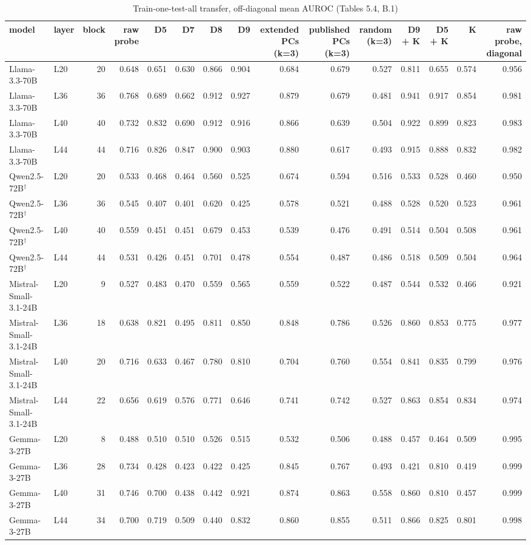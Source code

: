 \begin{table}
\caption{Train-one-test-all transfer, off-diagonal mean AUROC (Tables 5.4, B.1)}
\label{tab:x-transfer}
\begin{tabular}{llrrrrrrrrrrrrr}
\toprule
model & layer & block & raw probe & D5 & D7 & D8 & D9 & extended PCs (k=3) & published PCs (k=3) & random (k=3) & D9 + K & D5 + K & K & raw probe, diagonal \\
\midrule
Llama-3.3-70B & L20 & 20 & 0.648 & 0.651 & 0.630 & 0.866 & 0.904 & 0.684 & 0.679 & 0.527 & 0.811 & 0.655 & 0.574 & 0.956 \\
Llama-3.3-70B & L36 & 36 & 0.768 & 0.689 & 0.662 & 0.912 & 0.927 & 0.879 & 0.679 & 0.481 & 0.941 & 0.917 & 0.854 & 0.981 \\
Llama-3.3-70B & L40 & 40 & 0.732 & 0.832 & 0.690 & 0.912 & 0.916 & 0.866 & 0.639 & 0.504 & 0.922 & 0.899 & 0.823 & 0.983 \\
Llama-3.3-70B & L44 & 44 & 0.716 & 0.826 & 0.847 & 0.900 & 0.903 & 0.880 & 0.617 & 0.493 & 0.915 & 0.888 & 0.832 & 0.982 \\
Qwen2.5-72B$^\dagger$ & L20 & 20 & 0.533 & 0.468 & 0.464 & 0.560 & 0.525 & 0.674 & 0.594 & 0.516 & 0.533 & 0.528 & 0.460 & 0.950 \\
Qwen2.5-72B$^\dagger$ & L36 & 36 & 0.545 & 0.407 & 0.401 & 0.620 & 0.425 & 0.578 & 0.521 & 0.488 & 0.528 & 0.520 & 0.523 & 0.961 \\
Qwen2.5-72B$^\dagger$ & L40 & 40 & 0.559 & 0.451 & 0.451 & 0.679 & 0.453 & 0.539 & 0.476 & 0.491 & 0.514 & 0.504 & 0.508 & 0.961 \\
Qwen2.5-72B$^\dagger$ & L44 & 44 & 0.531 & 0.426 & 0.451 & 0.701 & 0.478 & 0.554 & 0.487 & 0.486 & 0.518 & 0.509 & 0.504 & 0.964 \\
Mistral-Small-3.1-24B & L20 & 9 & 0.527 & 0.483 & 0.470 & 0.559 & 0.565 & 0.559 & 0.522 & 0.487 & 0.544 & 0.532 & 0.466 & 0.921 \\
Mistral-Small-3.1-24B & L36 & 18 & 0.638 & 0.821 & 0.495 & 0.811 & 0.850 & 0.848 & 0.786 & 0.526 & 0.860 & 0.853 & 0.775 & 0.977 \\
Mistral-Small-3.1-24B & L40 & 20 & 0.716 & 0.633 & 0.467 & 0.780 & 0.810 & 0.704 & 0.760 & 0.554 & 0.841 & 0.835 & 0.799 & 0.976 \\
Mistral-Small-3.1-24B & L44 & 22 & 0.656 & 0.619 & 0.576 & 0.771 & 0.646 & 0.741 & 0.742 & 0.527 & 0.863 & 0.854 & 0.834 & 0.974 \\
Gemma-3-27B & L20 & 8 & 0.488 & 0.510 & 0.510 & 0.526 & 0.515 & 0.532 & 0.506 & 0.488 & 0.457 & 0.464 & 0.509 & 0.995 \\
Gemma-3-27B & L36 & 28 & 0.734 & 0.428 & 0.423 & 0.422 & 0.425 & 0.845 & 0.767 & 0.493 & 0.421 & 0.810 & 0.419 & 0.999 \\
Gemma-3-27B & L40 & 31 & 0.746 & 0.700 & 0.438 & 0.442 & 0.921 & 0.874 & 0.863 & 0.558 & 0.860 & 0.810 & 0.457 & 0.999 \\
Gemma-3-27B & L44 & 34 & 0.700 & 0.719 & 0.509 & 0.440 & 0.832 & 0.860 & 0.855 & 0.511 & 0.866 & 0.825 & 0.801 & 0.998 \\
\bottomrule
\end{tabular}
\end{table}
